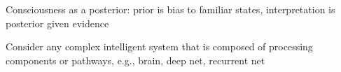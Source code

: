 \documentclass[11pt,letterpaper]{article}
\begin{document}
Consciousness as a posterior: prior is bias to familiar states, interpretation
is posterior given evidence

Consider any complex intelligent system that is composed of processing components or pathways, e.g., brain, deep net, recurrent net





\end{document}
